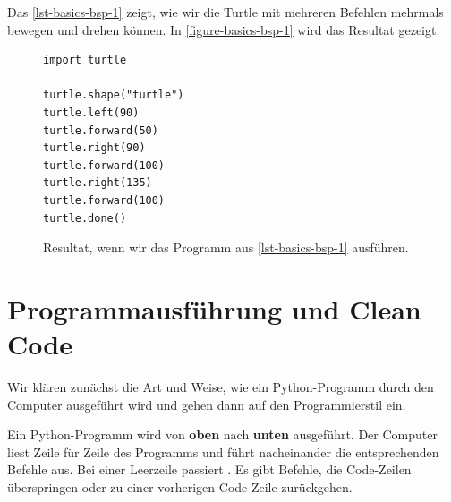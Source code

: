 \begin{example}

Das \autoref{lst-basics-bsp-1} zeigt, wie wir die Turtle mit mehreren Befehlen mehrmals bewegen und drehen können. In \autoref{figure-basics-bsp-1} wird das Resultat gezeigt.

\begin{figure}[htb]
\centering
\begin{minipage}{0.5\linewidth}
\centering
\begin{lstlisting}[caption={Beispielprogramm, welches die Figur aus \autoref{figure-basics-bsp-1} zeichnet (\graybgtexttt{bsp\_1.py}).}, label=lst-basics-bsp-1, showspaces=true]
import turtle

turtle.shape("turtle")
turtle.left(90)
turtle.forward(50)
turtle.right(90)
turtle.forward(100)
turtle.right(135)
turtle.forward(100)
turtle.done()
\end{lstlisting}
\end{minipage}
\hfill
\begin{minipage}[c]{0.4\linewidth}
\centering
{}
\caption{Resultat, wenn wir das Programm aus \autoref{lst-basics-bsp-1} ausführen.}
\label{figure-basics-bsp-1}
\end{minipage}
\end{figure}

\end{example}

\vspace{-2cm}

\section{Programmausführung und Clean Code}

Wir klären zunächst die Art und Weise, wie ein Python-Programm durch den Computer ausgeführt wird und gehen dann auf den Programmierstil ein.

\begin{definition}[Programmausführung]
Ein Python-Programm wird von \textbf{oben} nach \textbf{unten} ausgeführt. Der Computer liest Zeile für Zeile des Programms und führt nacheinander die entsprechenden Befehle aus. Bei einer Leerzeile passiert . Es gibt Befehle, die Code-Zeilen überspringen oder zu einer vorherigen Code-Zeile zurückgehen.
\end{definition}


